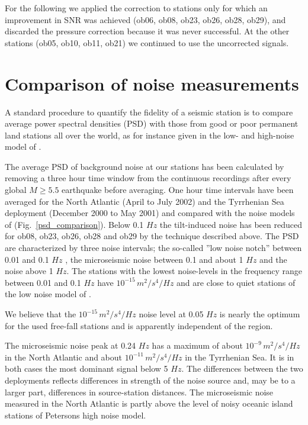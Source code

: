 \documentclass{article}
\begin{document}
{For the following we applied the correction to stations  only 
for which an improvement in SNR was achieved 
(ob06, ob08, ob23, ob26, ob28, ob29), 
and discarded the pressure correction because it was 
never successful.
At the other stations (ob05, ob10, ob11, ob21)
we continued to use the uncorrected signals.  




\section{Comparison of noise measurements}
A standard procedure to quantify the fidelity of a seismic station
is to compare average power spectral densities (PSD) 
with those
from good or poor permanent land stations all over the world, 
as for instance given in the low- and high-noise model 
of \cite{peterson:93}.

The average PSD of background noise at our stations 
has been calculated by removing 
a three hour time window from the continuous recordings after every 
global $M \geq 5.5$ earthquake before averaging. 
One hour time intervals have been averaged
for the North Atlantic (April to July 2002) and the 
Tyrrhenian Sea deployment 
(December 2000 to May 2001)
and compared with the noise models of \cite{peterson:93}
(Fig.~\ref{psd_comparison}).
Below 0.1 $Hz$
the tilt-induced noise has been reduced for
ob08, ob23, ob26, ob28 and ob29 by the technique 
described above.
The PSD are characterized by three noise 
intervals;
the so-called ''low noise notch'' between 0.01 and 0.1 $Hz$ 
\cite[e.g.][]{webb:98}, 
the microseismic noise between 0.1 and about 1 $Hz$ and 
the noise above 1 $Hz$.
The stations with the lowest noise-levels in the frequency range between 
0.01 and 0.1 $Hz$ have $10^{-15} \, m^2 / s^4 / Hz$ and are close to
quiet stations of the low noise model of \cite{peterson:93}.

We believe that the $10^{-15} \, m^2 / s^4 / Hz$ noise level at 
0.05 $Hz$ is nearly the optimum for the used free-fall 
stations and is apparently independent of the region. 

The microseismic noise peak at 0.24 $Hz$ 
has a maximum of  
about $10^{-9} \, m^2 / s^4 / Hz$ in the North Atlantic and 
about $10^{-11} \, m^2 / s^4 / Hz$ in the Tyrrhenian Sea. 
It is in both cases the most dominant signal below 5 $Hz$.
The differences between the two deployments reflects 
differences in strength of the noise source and, 
may be to a larger part, differences in 
source-station distances. 
The microseismic noise measured in the North Atlantic is 
partly above the level of noisy oceanic island stations of
Petersons 
high noise model.

}
\end{document}
